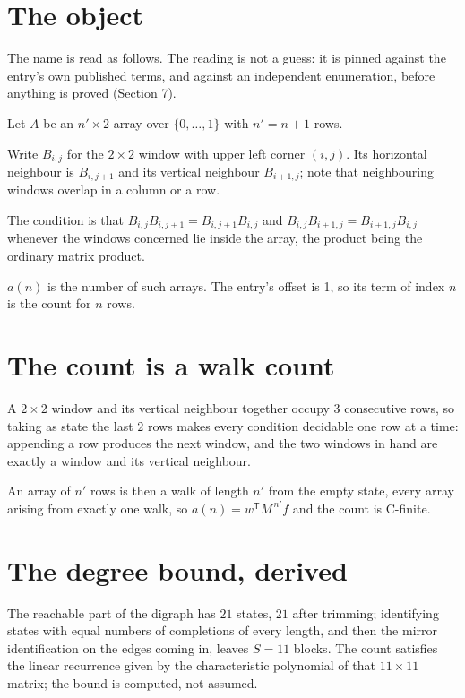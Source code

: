\documentclass[11pt]{article}
\theoremstyle{definition}
\begin{document}
\section{The object}

The name is read as follows. The reading is not a guess: it is pinned against the entry's own published terms, and against an independent enumeration, before anything is proved (Section 7).

Let $A$ be an $n' \times 2$ array over $\{0,\dots,1\}$ with $n' = n + 1$ rows.

Write $B_{i,j}$ for the $2\times2$ window with upper left corner $(i,j)$. Its horizontal neighbour is $B_{i,j+1}$ and its vertical neighbour $B_{i+1,j}$; note that neighbouring windows overlap in a column or a row.

The condition is that $B_{i,j}B_{i,j+1} = B_{i,j+1}B_{i,j}$ and $B_{i,j}B_{i+1,j} = B_{i+1,j}B_{i,j}$ whenever the windows concerned lie inside the array, the product being the ordinary matrix product.

$a(n)$ is the number of such arrays. The entry's offset is 1, so its term of index $n$ is the count for $n$ rows.

\section{The count is a walk count}

A $2\times2$ window and its vertical neighbour together occupy $3$ consecutive rows, so taking as state the last $2$ rows makes every condition decidable one row at a time: appending a row produces the next window, and the two windows in hand are exactly a window and its vertical neighbour.

An array of $n'$ rows is then a walk of length $n'$ from the empty state, every array arising from exactly one walk, so $a(n) = w^{\mathsf T}M^{\,n'}f$ and the count is C-finite.

\section{The degree bound, derived}

The reachable part of the digraph has $21$ states, $21$ after trimming; identifying states with equal numbers of completions of every length, and then the mirror identification on the edges coming in, leaves $S = 11$ blocks. The count satisfies the linear recurrence given by the characteristic polynomial of that $11\times11$ matrix; the bound is computed, not assumed.
\end{document}
